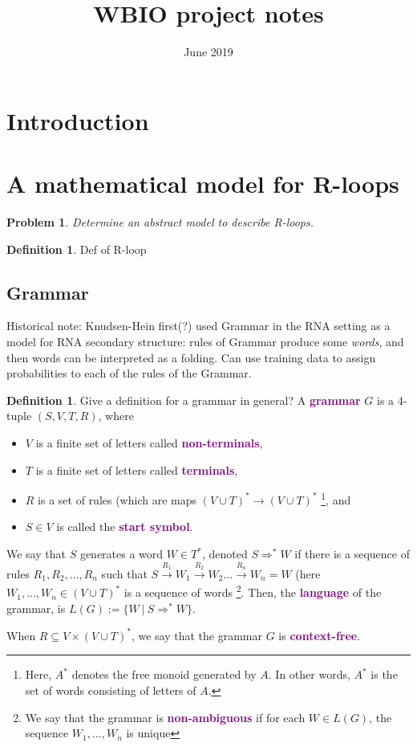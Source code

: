 \documentclass[usenames,dvipsnames]{article}
\title{WBIO project notes}
\author{}
\date{June 2019}
\theoremstyle{plain}
\newtheorem{prob}[theorem]{Problem}
\theoremstyle{definition}
\newtheorem{defn}[theorem]{Definition}
\newcommand{\defword}[1]{\textbf{\textcolor{purple}{#1}}}
\begin{document}
\maketitle

\section{Introduction}

\section{A mathematical model for R-loops}

\begin{prob}
Determine an abstract model to describe R-loops.
\end{prob}

\begin{defn}
Def of R-loop
\end{defn}

\subsection{Grammar}

Historical note: Knudsen-Hein first(?) used Grammar in the RNA setting as a model for RNA secondary structure: rules of Grammar produce some \emph{words}, and then words can be interpreted as a folding.  Can use training data to assign probabilities to each of the rules of the Grammar.
\begin{defn}
Give a definition for a grammar in general?
A \defword{grammar} $G$ is a 4-tuple $(S,V,T,R)$, where 
\begin{itemize}
    \item $V$ is a finite set of letters called \defword{non-terminals}, 
    \item $T$ is a finite set of letters called \defword{terminals},
    \item $R$ is a set of rules (which are maps $(V\cup T)^*\rightarrow (V\cup T)^*$ \footnote{Here, $A^*$ denotes the free monoid generated by $A$. In other words, $A^*$ is the set of words consisting of letters of $A$.}, and
    \item $S \in V$ is called the \defword{start symbol}.
\end{itemize}
We say that $S$ generates a word $W\in T^*$, denoted $S\Rightarrow^* W$ if there is a sequence of rules $R_1,R_2,\ldots,R_n$ such that $S \xrightarrow{R_1} W_1 \xrightarrow{R_2} W_2 \ldots \xrightarrow{R_n} W_n=W$ (here $W_1,\ldots,W_n\in (V\cup T)^*$ is a sequence of words
\footnote{We say that the grammar is \defword{non-ambiguous} if for each $W \in L(G)$, the sequence $W_1,\ldots,W_n$ is unique}. 
Then, the \defword{language} of the grammar, is $L(G):=\{ W \ |\ S\Rightarrow^* W\}.$ 

When $R\subseteq V\times (V\cup T)^*$, we say that the grammar $G$ is \defword{context-free}.
\end{defn}
\end{document}
